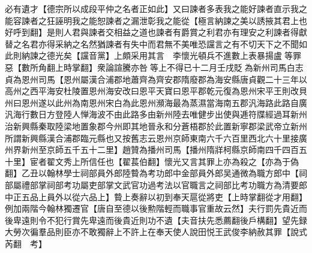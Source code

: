 必有遺才【德宗所以成段平仲之名者正如此】又曰諫者多表我之能好諫者直示我之能容諫者之狂誣明我之能恕諫者之漏泄彰我之能從【極言納諫之美以誘掖其君上也好呼到翻】是則人君與諫者交相益之道也諫者有爵賞之利君亦有理安之利諫者得獻替之名君亦得采納之名然猶諫者有失中而君無不美唯恐讜言之有不切天下之不聞如此則納諫之德光矣【讜音黨】上頗采用其言　李懷光頓兵不進數上表暴揚盧等罪惡【數所角翻上時掌翻】衆論諠騰亦咎等上不得已十二月壬戌貶為新州司馬白志貞為恩州司馬【恩州屬漢合浦郡地蕭齊為齊安郡隋廢郡為海安縣唐貞觀二十三年以高州之西平海安杜陵置恩州海安改曰恩平天寶曰恩平郡乾元復為恩州宋平王則改貝州曰恩州遂以此州為南恩州宋白為此恩州瀕海最為蒸濕當海南五郡汎海路此路自廣汎海行數日方登陸人惮海波不由此路多由新州陸去唯健步出使與逓符牒經過耳新州治新興縣秦取陸梁地置象郡今州即其地晉永和分蒼梧郡於此置新寧郡梁武帝立新州所謂新興縣漢合浦郡臨元縣也又按舊志云恩州京師東南六千六百里西北六十里接廣州界新州至京師五千五十二里】趙贊為播州司馬【播州隋牂柯縣京師南四千四百五十里】宦者翟文秀上所信任也【翟萇伯翻】懷光又言其罪上亦為殺之【亦為于偽翻】乙丑以翰林學士祠部員外郎陸䞇為考功郎中金部員外郎吴通微為職方郎中【祠部屬禮部掌祠部考功屬吏部掌文武官功過考法以官職言之祠部比考功職方為清要郎中正五品上員外以從六品上】䞇上奏辭以初到奉天扈從將吏【上時掌翻從才用翻】例加兩階今翰林獨遷官【唐自至德以後勲階輕而職事官重故云然】夫行罰先貴近而後卑遠則令不犯行賞先卑遠而後貴近則功不遺【夫音扶先悉薦翻後戶構翻】望先録大勞次徧羣品則臣亦不敢獨辭上不許上在奉天使人說田悦王武俊李納赦其罪【說式芮翻　考】


